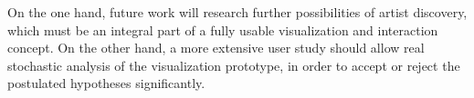 On the one hand, future work will research further possibilities of artist discovery, which must be an integral part of a fully usable visualization and interaction concept. On the other hand, a more extensive user study should allow real stochastic analysis of the visualization prototype, in order to accept or reject the postulated hypotheses significantly.